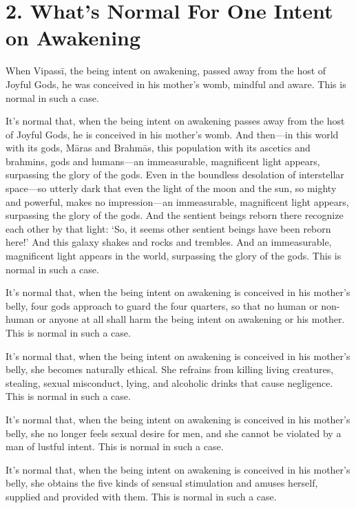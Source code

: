 \documentclass[12pt,openany]{book}%
\begin{document}
\section*{2. What’s Normal For One Intent on Awakening }

When \textsanskrit{Vipassī}, the being intent on awakening, passed away from the host of Joyful Gods, he was conceived in his mother’s womb, mindful and aware. This is normal in such a case. 

It’s normal that, when the being intent on awakening passes away from the host of Joyful Gods, he is conceived in his mother’s womb. And then—in this world with its gods, \textsanskrit{Māras} and \textsanskrit{Brahmās}, this population with its ascetics and brahmins, gods and humans—an immeasurable, magnificent light appears, surpassing the glory of the gods. Even in the boundless desolation of interstellar space—so utterly dark that even the light of the moon and the sun, so mighty and powerful, makes no impression—an immeasurable, magnificent light appears, surpassing the glory of the gods. And the sentient beings reborn there recognize each other by that light: ‘So, it seems other sentient beings have been reborn here!’ And this galaxy shakes and rocks and trembles. And an immeasurable, magnificent light appears in the world, surpassing the glory of the gods. This is normal in such a case. 

It’s normal that, when the being intent on awakening is conceived in his mother’s belly, four gods approach to guard the four quarters, so that no human or non-human or anyone at all shall harm the being intent on awakening or his mother. This is normal in such a case. 

It’s normal that, when the being intent on awakening is conceived in his mother’s belly, she becomes naturally ethical. She refrains from killing living creatures, stealing, sexual misconduct, lying, and alcoholic drinks that cause negligence. This is normal in such a case. 

It’s normal that, when the being intent on awakening is conceived in his mother’s belly, she no longer feels sexual desire for men, and she cannot be violated by a man of lustful intent. This is normal in such a case. 

It’s normal that, when the being intent on awakening is conceived in his mother’s belly, she obtains the five kinds of sensual stimulation and amuses herself, supplied and provided with them. This is normal in such a case. 
\end{document}
